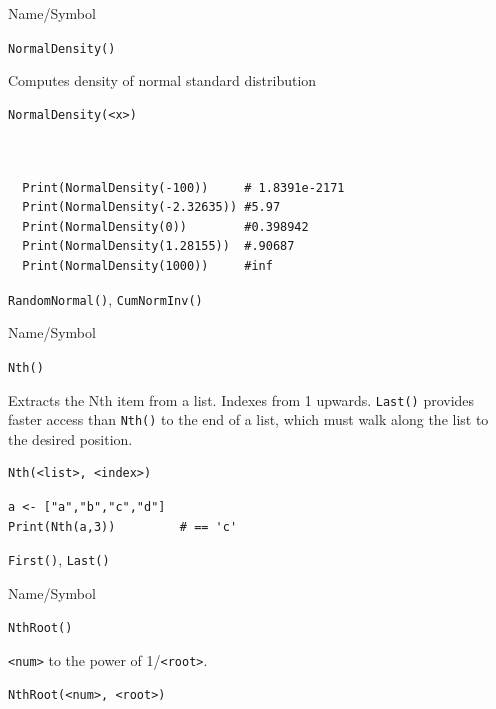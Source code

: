 \vfill
\newpage
{}
\vfill


\begin{desc}{Name/Symbol}
\item[Name/Symbol]	\verb+NormalDensity()+

\item[Description]	Computes density of normal standard distribution
\item[Usage]
\begin{verbatim}
NormalDensity(<x>)
\end{verbatim}

\item[Example]	
\begin{verbatim}


  Print(NormalDensity(-100))     # 1.8391e-2171
  Print(NormalDensity(-2.32635)) #5.97
  Print(NormalDensity(0))        #0.398942
  Print(NormalDensity(1.28155))  #.90687
  Print(NormalDensity(1000))     #inf

\end{verbatim}

\item[See Also]	\verb+RandomNormal()+, \verb+CumNormInv()+ 
\end{desc}



\begin{desc}{Name/Symbol}
\item[Name/Symbol]	\verb+Nth()+

\item[Description]	Extracts the Nth item from a list.  Indexes from 1 upwards.
		\verb+Last()+ provides faster access than \verb+Nth()+ to the end of a list, 
		which must walk along the list to the desired position.

\item[Usage]
\begin{verbatim}
Nth(<list>, <index>)
\end{verbatim}

\item[Example]	
\begin{verbatim}
a <- ["a","b","c","d"]
Print(Nth(a,3)) 		# == 'c'
\end{verbatim}

\item[See Also]	\verb+First()+, \verb+Last()+ 
\end{desc}

\begin{desc}{Name/Symbol}
\item[Name/Symbol]	\verb+NthRoot()+

\item[Description]	\verb+<num>+ to the power of  1/\verb+<root>+.

\item[Usage]		
\begin{verbatim}
NthRoot(<num>, <root>)
\end{verbatim}

\item[Example]	

\item[See Also]	
\end{desc}

